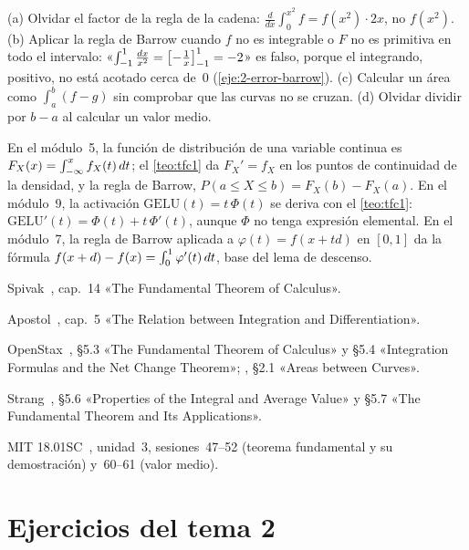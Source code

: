 \begin{observacion}\label{obs:2-errores}
(a) Olvidar el factor de la regla de la cadena: $\frac{d}{dx}\int_0^{x^{2}}f=f(x^{2})\cdot2x$, no $f(x^{2})$. (b) Aplicar la regla de Barrow cuando $f$ no es integrable o $F$ no es primitiva en todo el intervalo: «$\int_{-1}^{1}\frac{\mathop{}\!d x}{x^{2}}=\bigl[-\frac1x\bigr]_{-1}^{1}=-2$» es falso, porque el integrando, positivo, no está acotado cerca de~$0$ (\cref{eje:2-error-barrow}). (c) Calcular un área como $\int_a^b(f-g)$ sin comprobar que las curvas no se cruzan. (d) Olvidar dividir por $b-a$ al calcular un valor medio.
\end{observacion}

\begin{observacion}
En el módulo~5, la función de distribución de una variable continua es $F_X(x)=\int_{-\infty}^{x}f_X(t)\mathop{}\!d t$; el \cref{teo:tfc1} da $F_X'=f_X$ en los puntos de continuidad de la densidad, y la regla de Barrow, $P(a\le X\le b)=F_X(b)-F_X(a)$. En el módulo~9, la activación $\mathrm{GELU}(t)=t\,\Phi(t)$ se deriva con el \cref{teo:tfc1}: $\mathrm{GELU}'(t)=\Phi(t)+t\,\Phi'(t)$, aunque $\Phi$ no tenga expresión elemental. En el módulo~7, la regla de Barrow aplicada a $\varphi(t)=f(x+td)$ en $[0,1]$ da la fórmula $f(x+d)-f(x)=\int_0^1\varphi'(t)\mathop{}\!d t$, base del lema de descenso.
\end{observacion}

\begin{lecturas}
\item Spivak~\cite{spivak}, cap.~14 «The Fundamental Theorem of Calculus».
\item Apostol~\cite{apostol}, cap.~5 «The Relation between Integration and Differentiation».
\item OpenStax~\cite{openstax1}, §5.3 «The Fundamental Theorem of Calculus» y §5.4 «Integration Formulas and the Net Change Theorem»; \cite{openstax2}, §2.1 «Areas between Curves».
\item Strang~\cite{strang}, §5.6 «Properties of the Integral and Average Value» y §5.7 «The Fundamental Theorem and Its Applications».
\item MIT 18.01SC~\cite{mit1801}, unidad~3, sesiones~47--52 (teorema fundamental y su demostración) y~60--61 (valor medio).
\end{lecturas}

\section*{Ejercicios del tema 2}


